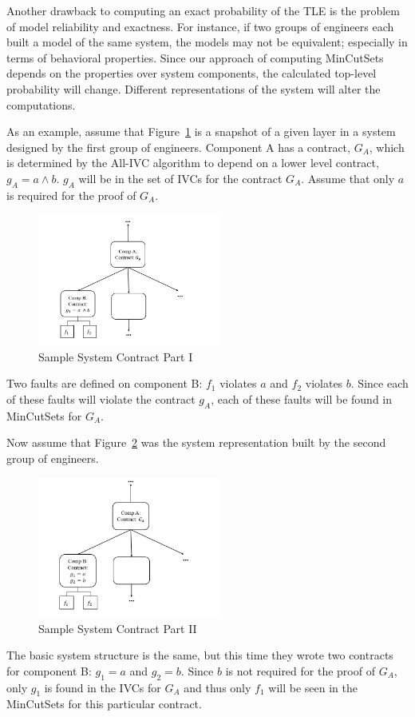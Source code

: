 Another drawback to computing an exact probability of the TLE is the problem of model reliability and exactness. For instance, if two groups of engineers each built a model of the same system, the models may not be equivalent; especially in terms of behavioral properties. Since our approach of computing MinCutSets depends on the properties over system components, the calculated top-level probability will change. Different representations of the system will alter the computations.  

As an example, assume that Figure~\ref{fig:probComp1} is a snapshot of a given layer in a system designed by the first group of engineers. Component A has a contract, $G_A$, which is determined by the All-IVC algorithm to depend on a lower level contract, $g_A = a \land b$. $g_A$ will be in the set of IVCs for the contract $G_A$. Assume that only $a$ is required for the proof of $G_A$. 

\begin{figure}[h]
\begin{center}
\includegraphics[width=6cm]{images/probComp1.PNG}
\caption{Sample System Contract Part I} \label{fig:probComp1}
\end{center}
\end{figure}

Two faults are defined on component B: $f_1$ violates $a$ and $f_2$ violates $b$. Since each of these faults will violate the contract $g_A$, each of these faults will be found in MinCutSets for $G_A$.

Now assume that Figure~\ref{fig:probComp2} was the system representation built by the second group of engineers. 
\begin{figure}[h]
\begin{center}
\includegraphics[width=6cm]{images/probComp2.PNG}
\caption{Sample System Contract Part II} \label{fig:probComp2}
\end{center}
\end{figure} 
The basic system structure is the same, but this time they wrote two contracts for component B: $g_1 = a$ and $g_2 = b$. Since $b$ is not required for the proof of $G_A$, only $g_1$ is found in the IVCs for $G_A$ and thus only $f_1$ will be seen in the MinCutSets for this particular contract. 

